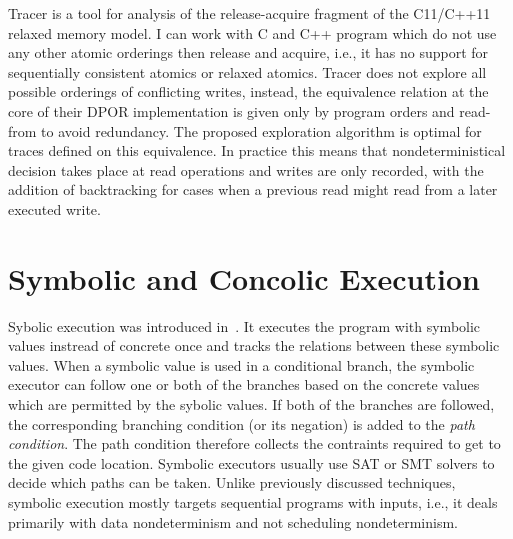 Tracer  is a tool for analysis of the release-acquire fragment of the C11/C++11 relaxed memory model.
I can work with C and C++ program which do not use any other atomic orderings then release and acquire, i.e., it has no support for sequentially consistent atomics or relaxed atomics.
Tracer does not explore all possible orderings of conflicting writes, instead, the equivalence relation at the core of their DPOR implementation is given only by program orders and read-from to avoid redundancy.
The proposed exploration algorithm is optimal for traces defined on this equivalence.
In practice this means that nondeterministical decision takes place at read operations and writes are only recorded, with the addition of backtracking for cases when a previous read might read from a later executed write.


\section{Symbolic and Concolic Execution}

Sybolic execution was introduced in~.
It executes the program with symbolic values instread of concrete once and tracks the relations between these symbolic values.
When a symbolic value is used in a conditional branch, the symbolic executor can follow one or both of the branches based on the concrete values which are permitted by the sybolic values.
If both of the branches are followed, the corresponding branching condition (or its negation) is added to the \emph{path condition}.
The path condition therefore collects the contraints required to get to the given code location.
Symbolic executors usually use SAT or SMT solvers to decide which paths can be taken.
Unlike previously discussed techniques, symbolic execution mostly targets sequential programs with inputs, i.e., it deals primarily with data nondeterminism and not scheduling nondeterminism.

